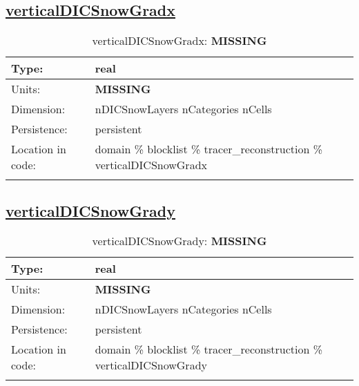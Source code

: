 \subsection[verticalDICSnowGradx]{\hyperref[sec:var_tab_tracer_reconstruction]{verticalDICSnowGradx}}
\label{subsec:var_sec_tracer_reconstruction_verticalDICSnowGradx}
\begin{center}
\begin{longtable}{| p{2.0in} | p{4.0in} |}
        \hline 
        Type: & real \\
        \hline 
        Units: & {\bf \color{red} MISSING} \\
        \hline 
        Dimension: & nDICSnowLayers nCategories nCells \\
        \hline 
        Persistence: & persistent \\
        \hline 
         Location in code: & domain \% blocklist \% tracer\_reconstruction \% verticalDICSnowGradx \\
         \hline 
    \caption{verticalDICSnowGradx: {\bf \color{red} MISSING}}
\end{longtable}
\end{center}
\subsection[verticalDICSnowGrady]{\hyperref[sec:var_tab_tracer_reconstruction]{verticalDICSnowGrady}}
\label{subsec:var_sec_tracer_reconstruction_verticalDICSnowGrady}
\begin{center}
\begin{longtable}{| p{2.0in} | p{4.0in} |}
        \hline 
        Type: & real \\
        \hline 
        Units: & {\bf \color{red} MISSING} \\
        \hline 
        Dimension: & nDICSnowLayers nCategories nCells \\
        \hline 
        Persistence: & persistent \\
        \hline 
         Location in code: & domain \% blocklist \% tracer\_reconstruction \% verticalDICSnowGrady \\
         \hline 
    \caption{verticalDICSnowGrady: {\bf \color{red} MISSING}}
\end{longtable}
\end{center}
